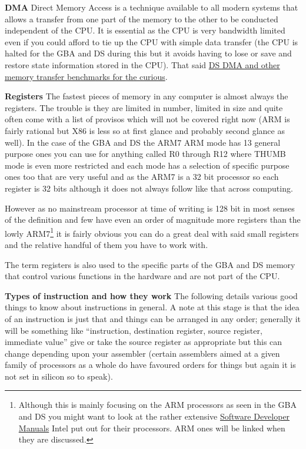 \documentclass[
]{book}
\begin{document}
\textbf{DMA} Direct Memory Access is a technique available to all modern systems that allows a transfer from one part of the memory to the other to be conducted independent of the CPU. It is essential as the CPU is very bandwidth limited even if you could afford to tie up the CPU with simple data transfer (the CPU is halted for the GBA and DS during this but it avoids having to lose or save and restore state information stored in the CPU). That said \href{http://drunkencoders.com/2013/03/some-memory-benchmarks/}{DS DMA and other memory transfer benchmarks for the curious}.

\textbf{Registers} The fastest pieces of memory in any computer is almost always the registers. The trouble is they are limited in number, limited in size and quite often come with a list of provisos which will not be covered right now (ARM is fairly rational but X86 is less so at first glance and probably second glance as well). In the case of the GBA and DS the ARM7 ARM mode has 13 general purpose ones you can use for anything called R0 through R12 where THUMB mode is even more restricted and each mode has a selection of specific purpose ones too that are very useful and as the ARM7 is a 32 bit processor so each register is 32 bits although it does not always follow like that across computing.

However as no mainstream processor at time of writing is 128 bit in most senses of the definition and few have even an order of magnitude more registers than the lowly ARM7\footnote{Although this is mainly focusing on the ARM processors as seen in the GBA and DS you might want to look at the rather extensive \href{http://www.intel.com/content/www/us/en/processors/architectures-.html}{Software Developer Manuals} Intel put out for their processors. ARM ones will be linked when they are discussed.} it is fairly obvious you can do a great deal with said small registers and the relative handful of them you have to work with.

The term registers is also used to the specific parts of the GBA and DS memory that control various functions in the hardware and are not part of the CPU.

\textbf{Types of instruction and how they work} The following details various good things to know about instructions in general. A note at this stage is that the idea of an instruction is just that and things can be arranged in any order; generally it will be something like ``instruction, destination register, source register, immediate value'' give or take the source register as appropriate but this can change depending upon your assembler (certain assemblers aimed at a given family of processors as a whole do have favoured orders for things but again it is not set in silicon so to speak).
\end{document}
